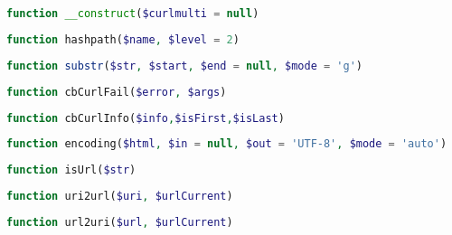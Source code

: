 \begin{lstlisting}[language=PHP]
function __construct($curlmulti = null)
\end{lstlisting}




\begin{lstlisting}[language=PHP]
function hashpath($name, $level = 2)
\end{lstlisting}







\begin{lstlisting}[language=PHP]
function substr($str, $start, $end = null, $mode = 'g')
\end{lstlisting}




\begin{lstlisting}[language=PHP]
function cbCurlFail($error, $args)
\end{lstlisting}







\begin{lstlisting}[language=PHP]
function cbCurlInfo($info,$isFirst,$isLast)
\end{lstlisting}




\begin{lstlisting}[language=PHP]
function encoding($html, $in = null, $out = 'UTF-8', $mode = 'auto')
\end{lstlisting}







\begin{lstlisting}[language=PHP]
function isUrl($str)
\end{lstlisting}




\begin{lstlisting}[language=PHP]
function uri2url($uri, $urlCurrent)
\end{lstlisting}







\begin{lstlisting}[language=PHP]
function url2uri($url, $urlCurrent)
\end{lstlisting}





